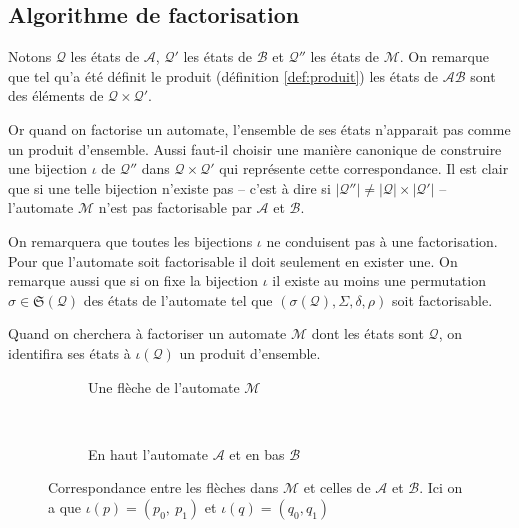 \documentclass[11pt,a4paper]{article}
\begin{document}
\subsection{Algorithme de factorisation}

  Notons $\mathcal{Q}$ les états de $\mathcal{A}$, $\mathcal{Q'}$ les états de $\mathcal{B}$ et $\mathcal{Q''}$ les états de $\mathcal{M}$. On remarque que tel qu'a été définit le produit (définition \ref{def:produit}) les états de $\mathcal{AB}$ sont des éléments de $\mathcal{Q}\times\mathcal{Q'}$.

Or quand on factorise un automate, l'ensemble de ses états n'apparait pas comme un produit d'ensemble. Aussi faut-il choisir une manière canonique de construire une bijection $\iota$ de $\mathcal{Q''}$ dans $\mathcal{Q}\times\mathcal{Q'}$ qui représente cette correspondance. Il est clair que si une telle bijection n'existe pas -- c'est à dire si $|\mathcal{Q}''| \ne |\mathcal{Q}|\times|\mathcal{Q'}|$ -- l'automate $\mathcal{M}$ n'est pas factorisable par $\mathcal{A}$ et $\mathcal{B}$.


On remarquera que toutes les bijections $\iota$ ne conduisent pas à une factorisation. Pour que l'automate soit factorisable il doit seulement en exister une. On remarque aussi que si on fixe la bijection $\iota$ il existe au moins une permutation $\sigma\in\mathfrak{S}(\mathcal{Q})$ des états de l'automate tel que $\left(\sigma(\mathcal{Q}), \Sigma, \delta, \rho\right)$ soit factorisable.


Quand on cherchera à factoriser un automate $\mathcal{M}$ dont les états sont $\mathcal{Q}$, on identifira ses états à $\iota(\mathcal{Q})$ un produit d'ensemble.

\begin{figure}[h!]
  \begin{subfigure}[b]{0.5\textwidth}
    \centering
    \caption{Une flèche de l'automate $\mathcal{M}$}
  \end{subfigure}
  ~
  \begin{subfigure}[b]{0.5\textwidth}
    \centering
    \caption{En haut l'automate $\mathcal{A}$ et en bas $\mathcal{B}$\label{fig:factor-ab}}
  \end{subfigure}
  \caption{Correspondance entre les flèches dans $\mathcal{M}$ et celles de $\mathcal{A}$ et $\mathcal{B}$. Ici on a que $\iota(p) = (p_0,~p_1)$ et $\iota(q)=(q_0, q_1)$\label{fig:facto}}
\end{figure}
\end{document}
